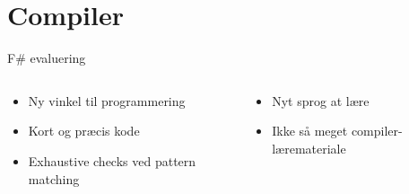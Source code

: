 \section{Compiler}
\begin{frame}{F\# evaluering}
  \begin{columns}
    \begin{column}{.5\textwidth}
      \begin{itemize}
        \item Ny vinkel til programmering
        \item Kort og præcis kode
        \item Exhaustive checks ved pattern matching
      \end{itemize}
    \end{column}
    
    \begin{column}{.5\textwidth}
      \begin{itemize}
        \item Nyt sprog at lære
        \item Ikke så meget compiler-læremateriale
      \end{itemize}
    \end{column}
  \end{columns}
\end{frame}

